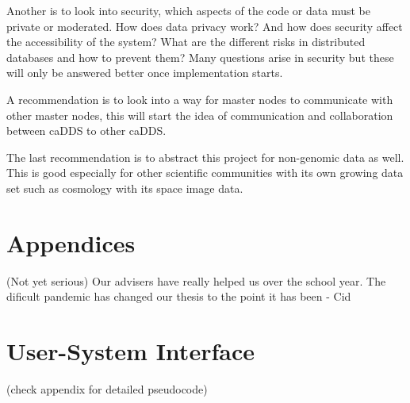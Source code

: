 \documentclass[acmsmall]{acmart}
\begin{document}
Another is to look into security, which aspects of the code or data must be private or moderated. How does data privacy work? And how does security affect the accessibility of the system? What are the different risks in distributed databases and how to prevent them? Many questions arise in security but these will only be answered better once implementation starts.

A recommendation is to look into a way for master nodes to communicate with other master nodes, this will start the idea of communication and collaboration between caDDS to other caDDS.

The last recommendation is to abstract this project for non-genomic data as well. This is good especially for other scientific communities with its own growing data set such as cosmology with its space image data. 


\section{Appendices}

\begin{acks}

(Not yet serious) Our advisers have really helped us over the school year. The dificult pandemic has changed our thesis to the point it has been - Cid
\end{acks}




\appendix

\section{User-System Interface}
(check appendix for detailed pseudocode)
\end{document}
